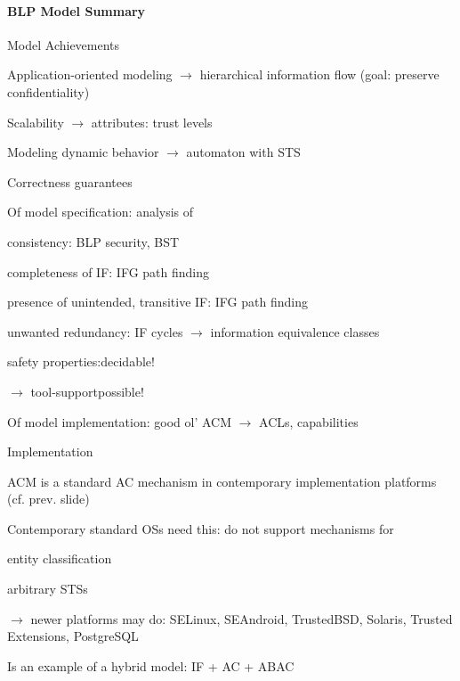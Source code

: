 \documentclass[a4paper]{article}
\begin{document}
\begin{multicols}{3}
    \paragraph{BLP Model Summary}
    Model Achievements
    \begin{itemize*}
        \item Application-oriented modeling $\rightarrow$ hierarchical information flow (goal: preserve confidentiality)
        \item Scalability $\rightarrow$ attributes: trust levels
        \item Modeling dynamic behavior $\rightarrow$ automaton with STS
        \item Correctness guarantees
              \begin{itemize*}
                  \item Of model specification: analysis of
                        \begin{itemize*}
                            \item consistency: BLP security, BST
                            \item completeness of IF: IFG path finding
                            \item presence of unintended, transitive IF: IFG path finding
                            \item unwanted redundancy: IF cycles $\rightarrow$ information equivalence classes
                            \item safety properties:decidable!
                            \item $\rightarrow$ tool-supportpossible!
                        \end{itemize*}
                  \item Of model implementation: good ol’ ACM $\rightarrow$ ACLs, capabilities
              \end{itemize*}
        \item Implementation
              \begin{itemize*}
                  \item ACM is a standard AC mechanism in contemporary implementation platforms (cf. prev. slide)
                  \item Contemporary standard OSs need this: do not support mechanisms for
                        \begin{itemize*}
                            \item entity classification
                            \item arbitrary STSs
                        \end{itemize*}
                  \item $\rightarrow$ newer platforms may do: SELinux, SEAndroid, TrustedBSD, Solaris, Trusted Extensions, PostgreSQL
              \end{itemize*}
        \item Is an example of a hybrid model: IF + AC + ABAC
    \end{itemize*}


\end{multicols}
\end{document}
